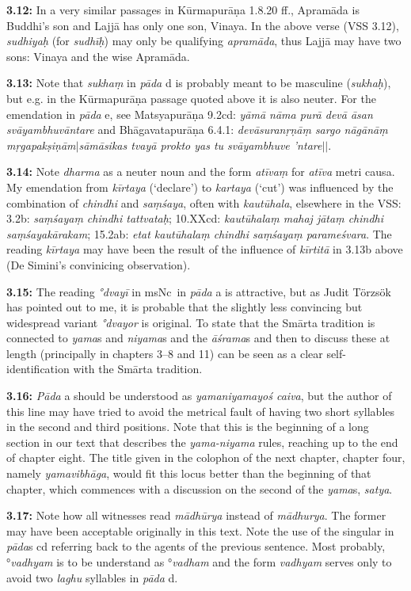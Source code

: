 \documentclass{article}
\newcommand{\vsnum}[1]{\textbf{#1}}
\newcommand{\skt}[1]{\textit{#1}}
\newcommand{\msNc}{msNc}
\begin{document}
\vsnum{3.12: }In a very similar passages in Kūrmapurāṇa 1.8.20 ff., Apramāda is Buddhi's son and Lajjā has only one son, Vinaya. In the above verse (VSS 3.12), \skt{sudhiyaḥ} (for \skt{sudhīḥ}) may only be qualifying \skt{apramāda}, thus Lajjā may have two sons: Vinaya and the wise Apramāda.

\vsnum{3.13: }Note that \skt{sukhaṃ} in \skt{pāda} d is probably meant to be masculine (\skt{sukhaḥ}), but e.g. in the Kūrmapurāṇa passage quoted above it is also neuter. For the emendation in \skt{pāda} e, see Matsyapurāṇa 9.2cd: \skt{yāmā nāma purā devā āsan svāyambhuvāntare} and Bhāgavatapurāṇa 6.4.1: \skt{devāsuranṛṇāṃ sargo nāgānāṃ mṛgapakṣiṇām$|$sāmāsikas tvayā prokto yas tu svāyambhuve 'ntare$||$}.

\vsnum{3.14: }Note \skt{dharma} as a neuter noun and the form \skt{atīvaṃ} for \skt{atīva} metri causa. My emendation from \skt{kīrtaya} (`declare') to \skt{kartaya} (`cut') was influenced by the combination of \skt{chindhi} and \skt{saṃśaya}, often with \skt{kautūhala}, elsewhere in the VSS: 3.2b: \skt{saṃśayaṃ chindhi tattvataḥ}; 10.XXcd: \skt{kautūhalaṃ mahaj jātaṃ chindhi saṃśayakārakam}; 15.2ab: \skt{etat kautūhalaṃ chindhi saṃśayaṃ parameśvara}. The reading \skt{kīrtaya} may have been the result of the influence of \skt{kīrtitā} in 3.13b above (De Simini's convinicing observation).

\vsnum{3.15: }The reading \skt{°dvayī} in \msNc\ in \skt{pāda} a is attractive, but as Judit Törzsök has pointed out to me, it is probable that the slightly less convincing but widespread variant \skt{°dvayor} is original. To state that the Smārta tradition is connected to \skt{yama}s and \skt{niyama}s and the \skt{āśrama}s and then to discuss these at length (principally in chapters 3--8 and 11) can be seen as a clear self-identification with the Smārta tradition.

\vsnum{3.16: }\skt{Pāda} a should be understood as \skt{yamaniyamayoś caiva}, but the author of this line may have tried to avoid the metrical fault of having two short syllables in the second and third positions. Note that this is the beginning of a long section in our text that describes the \skt{yama-niyama} rules, reaching up to the end of chapter eight. The title given in the colophon of the next chapter, chapter four, namely \skt{yamavibhāga}, would fit this locus better than the beginning of that chapter, which commences with a discussion on the second of the \skt{yama}s, \skt{satya}.

\vsnum{3.17: }Note how all witnesses read \skt{mādhūrya} instead of \skt{mādhurya}. The former may have been acceptable originally in this text. Note the use of the singular in \skt{pāda}s cd referring back to the agents of the previous sentence. Most probably, °\skt{vadhyam} is to be understand as °\skt{vadham} and the form \skt{vadhyam} serves only to avoid two \skt{laghu} syllables in \skt{pāda} d.
\end{document}
